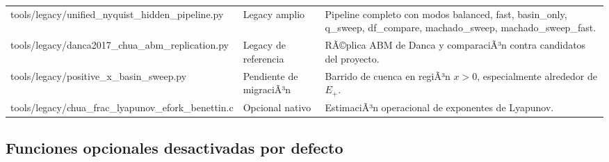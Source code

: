 \documentclass[11pt]{article}
\DeclareRobustCommand{\codepath}[1]{\begingroup\Urlmuskip=0mu plus 2mu\path{#1}\endgroup}
\def\codepath#1{#1}%
\begin{document}
\begin{center}
\begin{tabular}{@{}L{0.28\textwidth}L{0.24\textwidth}L{0.38\textwidth}@{}}
\codepath{tools/legacy/unified_nyquist_hidden_pipeline.py} & Legacy amplio & Pipeline completo con modos \codepath{balanced}, \codepath{fast}, \codepath{basin_only}, \codepath{q_sweep}, \codepath{df_compare}, \codepath{machado_sweep}, \codepath{machado_sweep_fast}.\\
\codepath{tools/legacy/danca2017_chua_abm_replication.py} & Legacy de referencia & RÃ©plica ABM de Danca y comparaciÃ³n contra candidatos del proyecto.\\
\codepath{tools/legacy/positive_x_basin_sweep.py} & Pendiente de migraciÃ³n & Barrido de cuenca en regiÃ³n \(x>0\), especialmente alrededor de \(E_+\).\\
\codepath{tools/legacy/chua_frac_lyapunov_efork_benettin.c} & Opcional nativo & EstimaciÃ³n operacional de exponentes de Lyapunov.\\
\bottomrule
\end{tabular}
\end{center}

\subsection{Funciones opcionales desactivadas por defecto}
\end{document}
